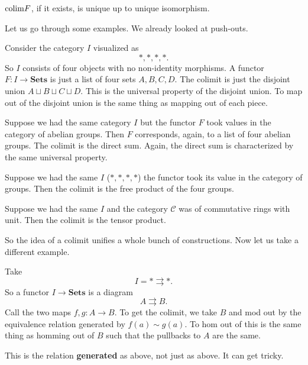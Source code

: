 \begin{proposition}
\begin{proposition}
$\mathrm{colim} F$, if it exists, is unique up to unique isomorphism.
\end{proposition}

Let us go through some examples. We already looked at push-outs.

\begin{example}
Consider the category $I$ visualized as
\[ \ast, \ast, \ast, \ast.  \]
So $I$ consists of four objects with no non-identity morphisms.
A functor $F: I \to \mathbf{Sets}$ is just a list of four sets $A, B, C, D$.
The colimit is just the disjoint union $A \sqcup B \sqcup C \sqcup D$. This is
the universal property of the disjoint union. To map out of the disjoint union
is the same thing as mapping out of each piece.
\end{example}


\begin{example}
Suppose we had the same category $I$ but the functor $F$ took values in the
category of abelian groups. Then $F$
corresponds, again, to a list of four abelian groups. The colimit is the direct
sum. Again, the direct sum is characterized by the same universal property.
\end{example}

\begin{example}
Suppose we had the same $I$ ($\ast, \ast, \ast, \ast$) the functor took its
value in the category of groups. Then the colimit is the
free product of the four groups.
\end{example}

\begin{example}
Suppose we had the same $I$ and the category $\mathcal{C}$ was of commutative
rings with unit. Then the colimit is the tensor product.
\end{example}

So the idea of a colimit unifies a whole bunch of constructions.
Now let us take a different example.

\begin{example}
Take
\[ I = \ast \rightrightarrows \ast.  \]
So a functor $I \to \mathbf{Sets}$ is a diagram
\[ A \rightrightarrows B.  \]
Call the two maps $f,g: A \to B$. To get the colimit, we take $B$ and mod out
by the equivalence relation generated by $f(a) \sim g(a)$.
To hom out of this is the same thing as homming  out of $B$ such that the
pullbacks to $A$ are the same.

This is the relation \textbf{generated} as above, not just as above. It can get
tricky.
\end{example}


\end{proposition}

